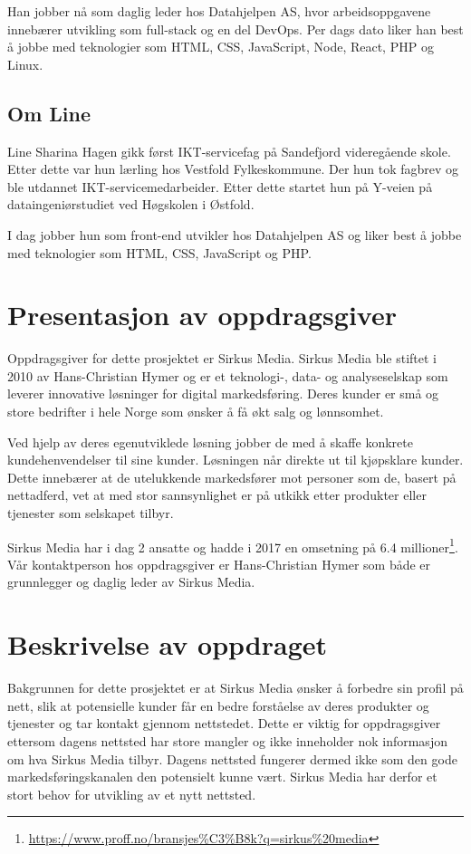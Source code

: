 Han jobber nå som daglig leder hos Datahjelpen AS, hvor arbeidsoppgavene innebærer utvikling som full-stack og en del DevOps. Per dags dato liker han best å jobbe med teknologier som HTML, CSS, JavaScript, Node, React, PHP og Linux.

\subsection{Om Line}
Line Sharina Hagen gikk først IKT-servicefag på Sandefjord videregående skole. Etter dette var hun lærling hos Vestfold Fylkeskommune. Der hun tok fagbrev og ble utdannet IKT-servicemedarbeider. Etter dette startet hun på Y-veien på dataingeniørstudiet ved Høgskolen i Østfold.

I dag jobber hun som front-end utvikler hos Datahjelpen AS og liker best å jobbe med teknologier som HTML, CSS, JavaScript og PHP.

\section{Presentasjon av oppdragsgiver}
Oppdragsgiver for dette prosjektet er Sirkus Media.
Sirkus Media ble stiftet i 2010 av Hans-Christian Hymer og er et teknologi-, data- og analyseselskap som leverer innovative løsninger for digital markedsføring. Deres kunder er små og store bedrifter i hele Norge som ønsker å få økt salg og lønnsomhet. 

Ved hjelp av deres egenutviklede løsning jobber de med å skaffe konkrete kundehenvendelser til sine kunder. Løsningen når direkte ut til kjøpsklare kunder. Dette innebærer at de utelukkende markedsfører mot personer som de, basert på nettadferd, vet at med stor sannsynlighet er på utkikk etter produkter eller tjenester som selskapet tilbyr.

Sirkus Media har i dag 2 ansatte og hadde i 2017 en omsetning på 6.4 millioner\footnote{\url{https://www.proff.no/bransjes\%C3\%B8k?q=sirkus\%20media}}.
Vår kontaktperson hos oppdragsgiver er Hans-Christian Hymer som både er grunnlegger og daglig leder av Sirkus Media. 

\section{Beskrivelse av oppdraget}
\label{sec:oppgaven}
Bakgrunnen for dette prosjektet er at Sirkus Media ønsker å forbedre sin profil på nett, slik at potensielle kunder får en bedre forståelse av deres produkter og tjenester og tar kontakt gjennom nettstedet. Dette er viktig for oppdragsgiver ettersom dagens nettsted har store mangler og ikke inneholder nok informasjon om hva Sirkus Media tilbyr. Dagens nettsted fungerer dermed ikke som den gode markedsføringskanalen den potensielt kunne vært. Sirkus Media har derfor et stort behov for utvikling av et nytt nettsted.

